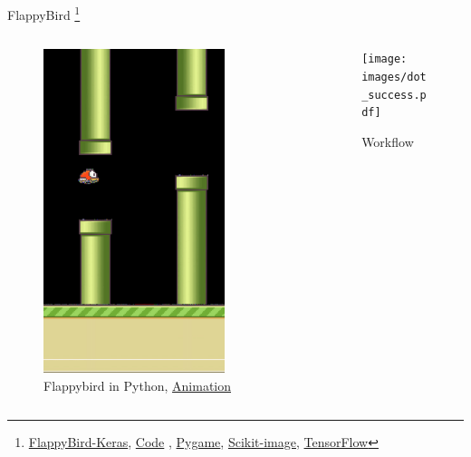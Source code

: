 \documentclass[presentation]{beamer}
\begin{document}
\begin{frame}[label={sec:org3b2e328}]{FlappyBird      \footnote{\href{https://yanpanlau.github.io/2016/07/10/FlappyBird-Keras.html}{ FlappyBird-Keras}, \href{https://github.com/yanpanlau/Keras-FlappyBird/blob/master/qlearn.py}{Code} , \href{https://www.pygame.org/wiki/about}{Pygame}, \href{https://scikit-image.org/}{Scikit-image}, \href{https://www.tensorflow.org/}{TensorFlow}}}
\begin{columns}
\begin{column}[c]{0.35\columnwidth}
\footnotesize
\begin{figure}[htbp]
\centering
\includegraphics[width=0.8\textwidth]{images/flappybird-0.png}
\caption{Flappybird in Python, \href{images/flappybird.gif}{Animation}}
\end{figure}
\end{column}

\begin{column}[c]{0.75\columnwidth}
\begin{figure}[htbp]
\centering
\texttt{[image: images/dot\_success.pdf]}
\caption{Workflow}
\end{figure}
\end{column}
\end{columns}
\end{frame}
\end{document}
